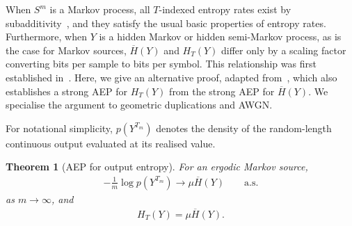 \documentclass[onecolumn]{IEEEtran}
\newtheorem{theorem}{Theorem}
\theoremstyle{definition}
\begin{document}
When \(S^m\) is a Markov process, all \(T\)-indexed entropy rates exist by subadditivity~\cite{McBain2024b}, and they satisfy the usual basic properties of entropy rates. Furthermore, when \(Y\) is a hidden Markov or hidden semi-Markov process, as is the case for Markov sources, \(\overline{H}(Y)\) and \(H_T(Y)\) differ only by a scaling factor converting bits per sample to bits per symbol. This relationship was first established in~\cite{McBain2024b}.
Here, we give an alternative proof, adapted from~\cite{McBain2025a}, {which also establishes a strong AEP for \(H_T(Y)\) from the strong AEP for \(\overline{H}(Y)\). We specialise the argument to geometric duplications and AWGN.}

{
For notational simplicity, $p(Y^{T_m})$ denotes the density of the
random-length continuous output evaluated at its realised value.
}

\begin{theorem}[AEP for output entropy]
\label{theorem:AEP-HY}
For an ergodic Markov source, 
\begin{align}
-\frac{1}{m}\log p(Y^{T_m}) \to \mu \overline{H}(Y)
\qquad \text{a.s.}
\end{align}
as \(m\to\infty\), and
\begin{align}
H_T(Y)=\mu \overline{H}(Y).
\end{align}
\end{theorem}
\end{document}
